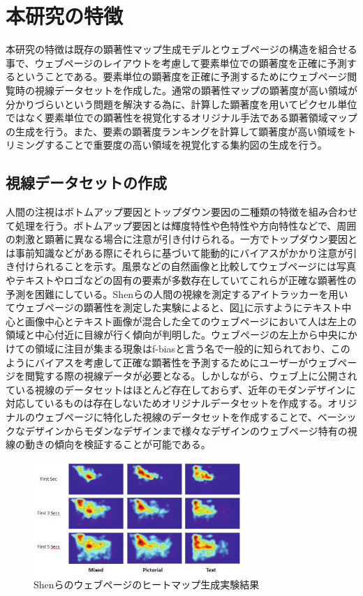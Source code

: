 \newpage
\renewcommand{\baselinestretch}{1.5}
\section{本研究の特徴}
\renewcommand{\baselinestretch}{1}
\par 本研究の特徴は既存の顕著性マップ生成モデルとウェブページの構造を組合せる事で、ウェブページのレイアウトを考慮して要素単位での顕著度を正確に予測するということである。要素単位の顕著度を正確に予測するためにウェブページ閲覧時の視線データセットを作成した。通常の顕著性マップの顕著度が高い領域が分かりづらいという問題を解決する為に、計算した顕著度を用いてピクセル単位ではなく要素単位での顕著性を視覚化するオリジナル手法である顕著領域マップの生成を行う。また、要素の顕著度ランキングを計算して顕著度が高い領域をトリミングすることで重要度の高い領域を視覚化する集約図の生成を行う。

\subsection{視線データセットの作成}
\par 人間の注視はボトムアップ要因とトップダウン要因の二種類の特徴を組み合わせて処理を行う。ボトムアップ要因とは輝度特性や色特性や方向特性などで、周囲の刺激と顕著に異なる場合に注意が引き付けられる。一方でトップダウン要因とは事前知識などがある際にそれらに基づいて能動的にバイアスがかかり注意が引き付けられることを示す。風景などの自然画像と比較してウェブページには写真やテキストやロゴなどの固有の要素が多数存在していてこれらが正確な顕著性の予測を困難にしている。Shenら\cite{shen2014webpage}の人間の視線を測定するアイトラッカーを用いてウェブページの顕著性を測定した実験によると、図\ref{fig_shen-experience}に示すようにテキスト中心と画像中心とテキスト画像が混合した全てのウェブページにおいて人は左上の領域と中心付近に目線が行く傾向が判明した。ウェブページの左上から中央にかけての領域に注目が集まる現象はf-biasと言う名で一般的に知られており、このようにバイアスを考慮して正確な顕著性を予測するためにユーザーがウェブページを閲覧する際の視線データが必要となる。しかしながら、ウェブ上に公開されている視線のデータセットはほとんど存在しておらず、近年のモダンデザインに対応しているものは存在しないためオリジナルデータセットを作成する。オリジナルのウェブページに特化した視線のデータセットを作成することで、ベーシックなデザインからモダンなデザインまで様々なデザインのウェブページ特有の視線の動きの傾向を検証することが可能である。

\begin{figure}[H]
  \centering
  \includegraphics[width=8cm]{figures/shen-bias.png}
  \caption{Shenらのウェブページのヒートマップ生成実験結果\cite{shen2014webpage}}
  \label{fig_shen-experience}
\end{figure}

